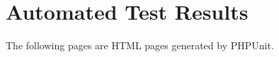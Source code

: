 \chapter{Automated Test Results}
\label{Automated Test Results}

The following pages are HTML pages generated by PHPUnit.

